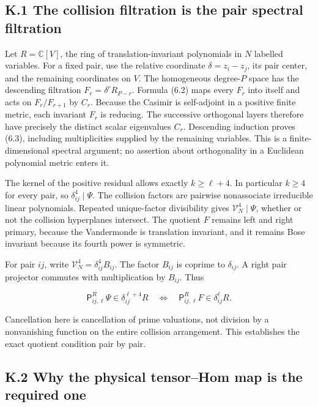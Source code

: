 \documentclass[a4paper,11pt]{article}
\numberwithin{equation}{section}
\begin{document}
\hypertarget{k.1-the-collision-filtration-is-the-pair-spectral-filtration}{%
\subsection{K.1 The collision filtration is the pair spectral filtration}\label{k.1-the-collision-filtration-is-the-pair-spectral-filtration}}

Let \(R=\mathbb C[V]\), the ring of translation-invariant polynomials in \(N\) labelled variables. For a fixed pair, use the relative coordinate \(\delta=z_i-z_j\), its pair center, and the remaining coordinates on \(V\). The homogeneous degree-\(P\) space has the descending filtration \(F_r=\delta^rR_{P-r}\). Formula (6.2) maps every \(F_r\) into itself and acts on \(F_r/F_{r+1}\) by \(C_r\). Because the Casimir is self-adjoint in a positive finite metric, each invariant \(F_r\) is reducing. The successive orthogonal layers therefore have precisely the distinct scalar eigenvalues \(C_r\). Descending induction proves (6.3), including multiplicities supplied by the remaining variables. This is a finite-dimensional spectral argument; no assertion about orthogonality in a Euclidean polynomial metric enters it.

The kernel of the positive residual allows exactly \(k\ge\ell+4\). In particular \(k\ge4\) for every pair, so \(\delta_{ij}^4\mid\Psi\). The collision factors are pairwise nonassociate irreducible linear polynomials. Repeated unique-factor divisibility gives \(\mathcal V_N^4\mid\Psi\), whether or not the collision hyperplanes intersect. The quotient \(F\) remains left and right primary, because the Vandermonde is translation invariant, and it remains Bose invariant because its fourth power is symmetric.

For pair \(ij\), write \(\mathcal V_N^4=\delta_{ij}^4B_{ij}\). The factor \(B_{ij}\) is coprime to \(\delta_{ij}\). A right pair projector commutes with multiplication by \(B_{ij}\). Thus

\[
\mathsf P^R_{ij,\ell}\Psi\in\delta_{ij}^{\ell+4}R
\quad\Longleftrightarrow\quad
\mathsf P^R_{ij,\ell}F\in\delta_{ij}^{\ell}R.
\tag{K.1}
\]

Cancellation here is cancellation of prime valuations, not division by a nonvanishing function on the entire collision arrangement. This establishes the exact quotient condition pair by pair.

\hypertarget{k.2-why-the-physical-tensorhom-map-is-the-required-one}{%
\subsection{K.2 Why the physical tensor--Hom map is the required one}\label{k.2-why-the-physical-tensorhom-map-is-the-required-one}}
\end{document}
